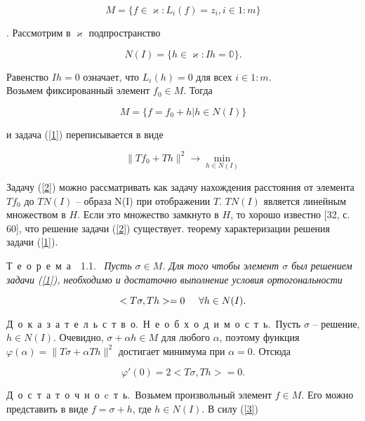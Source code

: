 \documentclass{book}
\newcommand{\theorem}[1]{Т~е~о~р~е~м~а~~#1.\ }
\newcommand{\nec}{Н~е~о~б~х~о~д~и~м~о~с~т~ь.\ }
\newcommand{\suff}{Д~о~с~т~а~т~о~ч~н~о~c~т~ь.\ }
\newcommand{\proof}{Д~о~к~а~з~а~т~е~л~ь~с~т~в~о.\ }
\begin{document}
\begin{equation*}
M=\{f\in\varkappa:L_i(f)=z_i, i\in 1:m\}
\end{equation*}

. Рассмотрим в $\varkappa$ подпространство

\begin{equation*}
N(I)=\{h\in\varkappa:Ih=\mathbb{0}\}.
\end{equation*}

\noindent Равенство $Ih=0$ означает, что $L_i(h)=0$ для всех $i\in 1:m$.\\
Возьмем фиксированный элемент $f_0\in M$. Тогда

\begin{equation*}
M=\{f=f_0+h|h\in N(I)\}
\end{equation*}

\noindent и задача (\ref{1}) переписывается в виде

\begin{equation}
\|Tf_0+Th\|^2\rightarrow\min_{h\in N(I)}
\label{2}
\end{equation}

\noindent Задачу (\ref{2}) можно рассматривать как задачу нахождения расстояния от элемента $Tf_0$ до $TN(I)$ -- образа N(I) при отображении $T$. $TN(I)$ является линейным множеством в $H$. Если это множество замкнуто в $H$, то хорошо известно [32, с. 60], что решение задачи (\ref{2}) существует.
 теорему характеризации решения задачи (\ref{1}). 
\par\theorem{1.1} \textit{Пусть $\sigma\in M$. Для того чтобы элемент $\sigma$ был решением задачи \textup{(\ref{1})}, необходимо и достаточно выполнение условия ортогональности}

\begin{equation}
<T\sigma,Th>=0 \hspace{5mm} \forall h \in N(I).
\label{3}
\end{equation}

\proof\nec  Пусть $\sigma$ --  решение, $h\in N(I)$. Очевидно, $\sigma+\alpha h\in M$ для любого $\alpha$, поэтому функция $\varphi(\alpha)=\|T\sigma+\alpha Th\|^2$ достигает минимума при $\alpha=0$. Отсюда

\begin{equation*}
\varphi'(0)=2<T\sigma,Th>=0.
\end{equation*}

\suff Возьмем произвольный элемент $f\in M$. Его можно представить в виде $f=\sigma+h$, где $h\in N(I)$. В силу (\ref{3})
\end{document}
